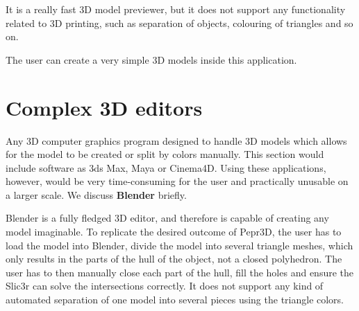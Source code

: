 It is a really fast 3D model previewer, but it does not support any functionality related to 3D printing, such as separation of objects, colouring of triangles and so on.

The user can create a very simple 3D models inside this application.

\section{Complex 3D editors}

Any 3D computer graphics program designed to handle 3D models which allows for the model to be created or split by colors manually. This section would include software as 3ds Max, Maya or Cinema4D. Using these applications, however, would be very time-consuming for the user and practically unusable on a larger scale. We discuss \textbf{Blender} briefly.

Blender is a fully fledged 3D editor, and therefore is capable of creating any model imaginable. To replicate the desired outcome of Pepr3D, the user has to load the model into Blender, divide the model into several triangle meshes, which only results in the parts of the hull of the object, not a closed polyhedron. The user has to then manually close each part of the hull, fill the holes and ensure the Slic3r can solve the intersections correctly. It does not support any kind of automated separation of one model into several pieces using the triangle colors.

